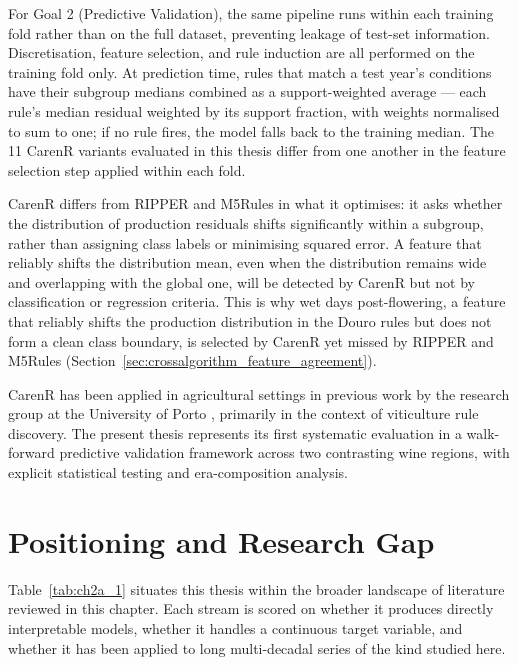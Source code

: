 For Goal 2 (Predictive Validation), the same pipeline runs within each training fold rather than on the full dataset, preventing leakage of test-set information. Discretisation, feature selection, and rule induction are all performed on the training fold only. At prediction time, rules that match a test year's conditions have their subgroup medians combined as a support-weighted average --- each rule's median residual weighted by its support fraction, with weights normalised to sum to one; if no rule fires, the model falls back to the training median. The 11 CarenR variants evaluated in this thesis differ from one another in the feature selection step applied within each fold.

CarenR differs from RIPPER and M5Rules in what it optimises: it asks whether the distribution of production residuals shifts significantly within a subgroup, rather than assigning class labels or minimising squared error. A feature that reliably shifts the distribution mean, even when the distribution remains wide and overlapping with the global one, will be detected by CarenR but not by classification or regression criteria. This is why wet days post-flowering, a feature that reliably shifts the production distribution in the Douro rules but does not form a clean class boundary, is selected by CarenR yet missed by RIPPER and M5Rules (Section~\ref{sec:crossalgorithm_feature_agreement}).

CarenR has been applied in agricultural settings in previous work by the research group at the University of Porto \citep{Moreira2022}, primarily in the context of viticulture rule discovery. The present thesis represents its first systematic evaluation in a walk-forward predictive validation framework across two contrasting wine regions, with explicit statistical testing and era-composition analysis.


\section{Positioning and Research Gap}\label{sec:positioning_and_research_gap}

Table~\ref{tab:ch2a_1} situates this thesis within the broader landscape of literature reviewed in this chapter. Each stream is scored on whether it produces directly interpretable models, whether it handles a continuous target variable, and whether it has been applied to long multi-decadal series of the kind studied here.

